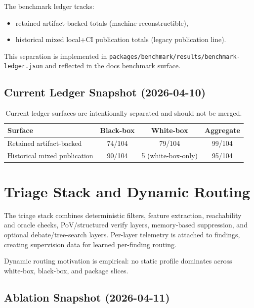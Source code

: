 \documentclass[11pt]{article}
\begin{document}
The benchmark ledger tracks:
\begin{itemize}
  \item retained artifact-backed totals (machine-reconstructible),
  \item historical mixed local+CI publication totals (legacy publication line).
\end{itemize}

This separation is implemented in
\texttt{packages/benchmark/results/benchmark-ledger.json} and reflected in the
docs benchmark surface.

\subsection{Current Ledger Snapshot (2026-04-10)}

\begin{table}[ht]
\centering
\small
\begin{tabular}{lccc}
\toprule
Surface & Black-box & White-box & Aggregate \\
\midrule
Retained artifact-backed & 74/104 & 79/104 & 99/104 \\
Historical mixed publication & 90/104 & 5 (white-box-only) & 95/104 \\
\bottomrule
\end{tabular}
\caption{Current ledger surfaces are intentionally separated and should not be merged.}
\label{tab:ledger}
\end{table}

\section{Triage Stack and Dynamic Routing}

The triage stack combines deterministic filters, feature extraction,
reachability and oracle checks, PoV/structured verify layers, memory-based
suppression, and optional debate/tree-search layers. Per-layer telemetry is
attached to findings, creating supervision data for learned per-finding routing.

Dynamic routing motivation is empirical: no static profile dominates across
white-box, black-box, and package slices.

\subsection{Ablation Snapshot (2026-04-11)}
\end{document}

